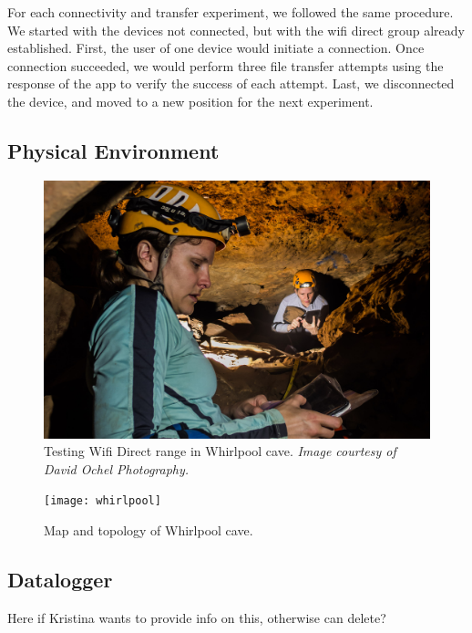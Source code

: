 \documentclass[10pt,twocolumn]{article}
\begin{document}
For each connectivity and transfer experiment, we followed the same procedure. 
We started with the devices not connected, but with the wifi direct group already established.
First, the user of one device would initiate a connection.
Once connection succeeded, we would perform three file transfer attempts using the response of the app to verify the success of each attempt.
Last, we disconnected the device, and moved to a new position for the next experiment.

\subsection{Physical Environment}

\begin{figure}
\includegraphics[width=\columnwidth]{cavewifi}
\caption{Testing Wifi Direct range in Whirlpool cave. \textit{Image courtesy of David Ochel Photography.}}
\end{figure}

\begin{figure}
\texttt{[image: whirlpool]}
\caption{Map and topology of Whirlpool cave.}
\end{figure}

\subsection{Datalogger}
Here if Kristina wants to provide info on this, otherwise can delete?
\end{document}
